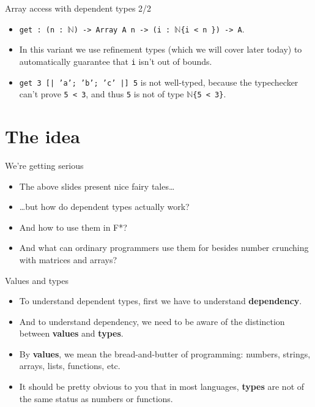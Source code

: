 \documentclass{beamer}
\newcommand{\m}[1]{\texttt{#1}}
\begin{document}
\begin{frame}{Array access with dependent types 2/2}
\begin{itemize}
	\item \m{get :\ (n :\ $\mathbb{N}$) -> Array A n -> (i :\ $\mathbb{N}$\{i < n \}) -> A}.
	\item In this variant we use refinement types (which we will cover later today) to automatically guarantee that \m{i} isn't out of bounds.
	\item \m{get 3 [| 'a'; 'b'; 'c' |] 5} is not well-typed, because the typechecker can't prove \m{5 < 3}, and thus \m{5} is not of type \m{$\mathbb{N}$\{5 < 3\}}.
\end{itemize}
\end{frame}

\section{The idea}

\begin{frame}{We're getting serious}
\begin{itemize}
	\item The above slides present nice fairy tales\dots
	\item \dots but how do dependent types actually work?
	\item And how to use them in F*?
	\item And what can ordinary programmers use them for besides number crunching with matrices and arrays?
\end{itemize}
\end{frame}

\begin{frame}{Values and types}
\begin{itemize}
	\item To understand dependent types, first we have to understand \textbf{dependency}.
	\item And to understand dependency, we need to be aware of the distinction between \textbf{values} and \textbf{types}.
	\item By \textbf{values}, we mean the bread-and-butter of programming: numbers, strings, arrays, lists, functions, etc.
	\item It should be pretty obvious to you that in most languages, \textbf{types} are not of the same status as numbers or functions.
\end{itemize}
\end{frame}
\end{document}
